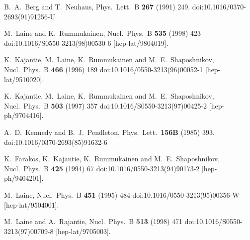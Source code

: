 \documentclass[11pt,a4paper]{article}
\begin{document}
\begin{thebibliography}{*}


  B.~A.~Berg and T.~Neuhaus,
  Phys.\ Lett.\ B {\bf 267} (1991) 249.
  doi:10.1016/0370-2693(91)91256-U

M.~Laine and K.~Rummukainen,
Nucl.\ Phys.\ B {\bf 535} (1998) 423
doi:10.1016/S0550-3213(98)00530-6
[hep-lat/9804019].


  K.~Kajantie, M.~Laine, K.~Rummukainen and M.~E.~Shaposhnikov,
  Nucl.\ Phys.\ B {\bf 466} (1996) 189
  doi:10.1016/0550-3213(96)00052-1
  [hep-lat/9510020].
  
  K.~Kajantie, M.~Laine, K.~Rummukainen and M.~E.~Shaposhnikov,
  Nucl.\ Phys.\ B {\bf 503} (1997) 357
  doi:10.1016/S0550-3213(97)00425-2
  [hep-ph/9704416].


  A.~D.~Kennedy and B.~J.~Pendleton,
  Phys.\ Lett.\  {\bf 156B} (1985) 393.
  doi:10.1016/0370-2693(85)91632-6

  K.~Farakos, K.~Kajantie, K.~Rummukainen and M.~E.~Shaposhnikov,
  Nucl.\ Phys.\ B {\bf 425} (1994) 67
  doi:10.1016/0550-3213(94)90173-2
  [hep-ph/9404201].


  M.~Laine,
  Nucl.\ Phys.\ B {\bf 451} (1995) 484
  doi:10.1016/0550-3213(95)00356-W
  [hep-lat/9504001].

  M.~Laine and A.~Rajantie,
  Nucl.\ Phys.\ B {\bf 513} (1998) 471
  doi:10.1016/S0550-3213(97)00709-8
  [hep-lat/9705003].


\end{thebibliography}
\end{document}
